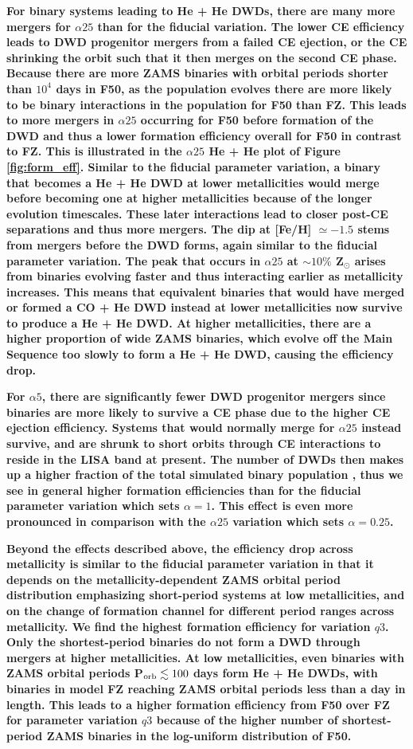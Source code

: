 \documentclass[twocolumn, linenumbers]{aastex631}
\begin{document}
\textbf{For binary systems leading to He + He DWDs, there are many more mergers for $\alpha25$ than for the fiducial variation. The lower CE efficiency leads to DWD progenitor mergers from a failed CE ejection, or the CE shrinking the orbit such that it then merges on the second CE phase. Because there are more ZAMS binaries with orbital periods shorter than $10^4$ days in F50, as the population evolves there are more likely to be binary interactions in the population for F50 than FZ. This leads to more mergers in $\alpha25$ occurring for F50 before formation of the DWD and thus a lower formation efficiency overall for F50 in contrast to FZ. This is illustrated in the $\alpha25$ He + He plot of Figure \ref{fig:form_eff}. Similar to the fiducial parameter variation, a binary that becomes a He + He DWD at lower metallicities would merge before becoming one at higher metallicities because of the longer evolution timescales. These later interactions lead to closer post-CE separations and thus more mergers. The dip at [Fe/H] $\simeq -1.5$ stems from mergers before the DWD forms, again similar to the fiducial parameter variation. The peak that occurs in $\alpha25$ at $\sim 10\%$ Z$_\odot$ arises from binaries evolving faster and thus interacting earlier as metallicity increases. This means that equivalent binaries that would have merged or formed a CO + He DWD instead at lower metallicities now survive to produce a He + He DWD. At higher metallicities, there are a higher proportion of wide ZAMS binaries, which evolve off the Main Sequence too slowly to form a He + He DWD, causing the efficiency drop.}

\textbf{For $\alpha5$, there are significantly fewer DWD progenitor mergers since binaries are more likely to survive a CE phase due to the higher CE ejection efficiency. Systems that would normally merge for $\alpha25$ instead survive, and are shrunk to short orbits through CE interactions to reside in the LISA band at present. The number of DWDs then makes up a higher fraction of the total simulated binary population , thus we see in general higher formation efficiencies than for the fiducial parameter variation which sets $\alpha=1$. This effect is even more pronounced in comparison with the $\alpha25$ variation which sets $\alpha=0.25$.}

\textbf{Beyond the effects described above, the efficiency drop across metallicity is similar to the fiducial parameter variation in that it depends on the metallicity-dependent ZAMS orbital period distribution emphasizing short-period systems at low metallicities, and on the change of formation channel for different period ranges across metallicity. We find the highest formation efficiency for variation $q3$. Only the shortest-period binaries do not form a DWD through mergers at higher metallicities. At low metallicities, even binaries with ZAMS orbital periods P$_{\rm{orb}}\lesssim 100$ days form He + He DWDs, with binaries in model FZ reaching ZAMS orbital periods less than a day in length. This leads to a higher formation efficiency from F50 over FZ for parameter variation $q3$ because of the higher number of shortest-period ZAMS binaries in the log-uniform distribution of F50.}
\end{document}
